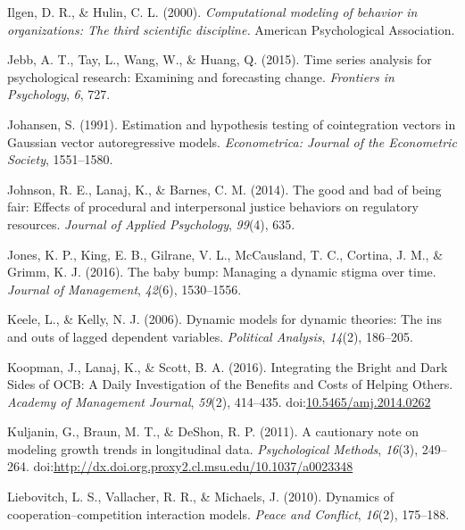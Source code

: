 \documentclass[english,,man]{apa6}
\theoremstyle{definition}
\theoremstyle{definition}
\theoremstyle{definition}
\theoremstyle{remark}
\begin{document}
\leavevmode\hypertarget{ref-ilgen_computational_2000}{}%
Ilgen, D. R., \& Hulin, C. L. (2000). \emph{Computational modeling of
behavior in organizations: The third scientific discipline.} American
Psychological Association.

\leavevmode\hypertarget{ref-jebb_time_2015}{}%
Jebb, A. T., Tay, L., Wang, W., \& Huang, Q. (2015). Time series
analysis for psychological research: Examining and forecasting change.
\emph{Frontiers in Psychology}, \emph{6}, 727.

\leavevmode\hypertarget{ref-johansen_estimation_1991}{}%
Johansen, S. (1991). Estimation and hypothesis testing of cointegration
vectors in Gaussian vector autoregressive models. \emph{Econometrica:
Journal of the Econometric Society}, 1551--1580.

\leavevmode\hypertarget{ref-johnson_good_2014}{}%
Johnson, R. E., Lanaj, K., \& Barnes, C. M. (2014). The good and bad of
being fair: Effects of procedural and interpersonal justice behaviors on
regulatory resources. \emph{Journal of Applied Psychology},
\emph{99}(4), 635.

\leavevmode\hypertarget{ref-jones_baby_2016}{}%
Jones, K. P., King, E. B., Gilrane, V. L., McCausland, T. C., Cortina,
J. M., \& Grimm, K. J. (2016). The baby bump: Managing a dynamic stigma
over time. \emph{Journal of Management}, \emph{42}(6), 1530--1556.

\leavevmode\hypertarget{ref-keele_dynamic_2006}{}%
Keele, L., \& Kelly, N. J. (2006). Dynamic models for dynamic theories:
The ins and outs of lagged dependent variables. \emph{Political
Analysis}, \emph{14}(2), 186--205.

\leavevmode\hypertarget{ref-koopman_integrating_2016}{}%
Koopman, J., Lanaj, K., \& Scott, B. A. (2016). Integrating the Bright
and Dark Sides of OCB: A Daily Investigation of the Benefits and Costs
of Helping Others. \emph{Academy of Management Journal}, \emph{59}(2),
414--435.
doi:\href{https://doi.org/10.5465/amj.2014.0262}{10.5465/amj.2014.0262}

\leavevmode\hypertarget{ref-kuljanin_cautionary_2011}{}%
Kuljanin, G., Braun, M. T., \& DeShon, R. P. (2011). A cautionary note
on modeling growth trends in longitudinal data. \emph{Psychological
Methods}, \emph{16}(3), 249--264.
doi:\href{https://doi.org/http://dx.doi.org.proxy2.cl.msu.edu/10.1037/a0023348}{http://dx.doi.org.proxy2.cl.msu.edu/10.1037/a0023348}

\leavevmode\hypertarget{ref-liebovitch2010dynamics}{}%
Liebovitch, L. S., Vallacher, R. R., \& Michaels, J. (2010). Dynamics of
cooperation--competition interaction models. \emph{Peace and Conflict},
\emph{16}(2), 175--188.
\end{document}
